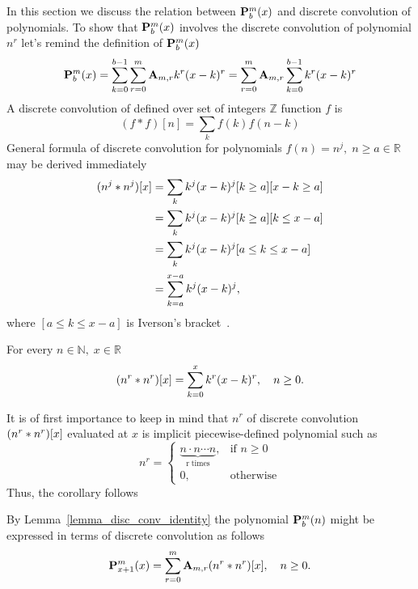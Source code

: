 In this section we discuss the relation between ${\mathbf{P}}\sp{m} \sb{b}(x)$ and discrete convolution of
polynomials.
To show that ${\mathbf{P}}\sp{m} \sb{b}(x)$ involves the discrete convolution of polynomial $n^r$
let's remind the definition of ${\mathbf{P}}\sp{m} \sb{b}(x)$
\begin{equation*}
    {\mathbf{P}}\sp{m} \sb{b}(x) = \sum_{k=0}^{b-1} \sum_{r=0}^{m} {\mathbf{A}} \sb{m,r} k^r (x-k)^r
    = \sum_{r=0}^{m} {\mathbf{A}} \sb{m,r} \sum_{k=0}^{b-1} k^r (x-k)^r
\end{equation*}
A discrete convolution of defined over set of integers $\mathbb{Z}$ function $f$ is
\begin{equation*}
(f \ast f)[n]
    = \sum_{k} f(k) f(n-k)
\end{equation*}
General formula of discrete convolution for polynomials $f(n) = n^j, \; n\geq a \in \mathbb{R}$ may be derived immediately
\begin{equation*}
    \begin{split}
        (n \sp{j} \ast n \sp{j}) [x]
        &=\sum_{k} k^j (x-k)^j [k\geq a][x-k\geq a] \\
        &=\sum_{k} k^j (x-k)^j [k\geq a][k\leq x-a] \\
        &=\sum_{k} k^j (x-k)^j [a \leq k \leq x-a] \\
        &=\sum_{k=a}^{x-a} k^j (x-k)^j,
    \end{split}
\end{equation*}
where $[a \leq k \leq x-a]$ is Iverson's bracket~\cite{iverson_apl, knuth_two_notes_on_notation}.
\begin{lem}
    \label{lemma_disc_conv_identity}
    For every $n\in\mathbb{N}, \; x\in\mathbb{R}$
    \[
        (n \sp{r} \ast n \sp{r}) [x] = \sum_{k=0}^{x} k^r (x-k)^r, \quad n\geq 0.
    \]
\end{lem}
It is of first importance to keep in mind that  $n^r$ of discrete convolution $(n \sp{r} \ast n \sp{r}) [x]$ evaluated at $x$
is implicit piecewise-defined polynomial such as
\begin{equation*}
    n^{r} =
    \begin{cases}
        \underbrace{n \cdot n \cdots n}_{\mathrm{r \; times}}, & \mbox{if } n \geq 0 \\
        0, & \mbox{otherwise}
    \end{cases}
\end{equation*}
Thus, the corollary follows
\begin{cor}
    \label{cor_polynomial_p_and_macaulay_convolution}
    By Lemma~\ref{lemma_disc_conv_identity} the polynomial ${\mathbf{P}}\sp{m} \sb{b}(n)$ might be expressed in terms
    of discrete convolution as follows
    \[
        {\mathbf{P}}\sp{m} \sb{x+1}(x) = \sum_{r=0}^{m} {\mathbf{A}} \sb{m,r} (n \sp{r} \ast n \sp{r}) [x], \quad n\geq 0.
    \]
\end{cor}
